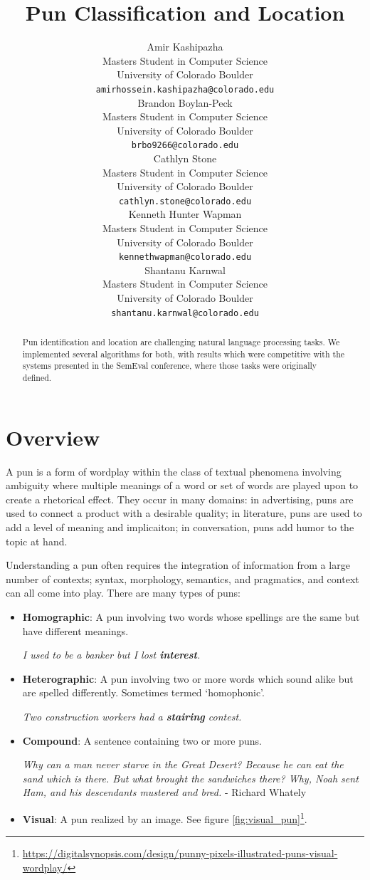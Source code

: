 \documentclass{article}
\title{Pun Classification and Location}
\author{
   Amir Kashipazha \\
   Masters Student in Computer Science\\
   University of Colorado Boulder\\
   \texttt{amirhossein.kashipazha@colorado.edu} \\
   \And
   Brandon Boylan-Peck \\
   Masters Student in Computer Science\\
   University of Colorado Boulder \\
   \texttt{brbo9266@colorado.edu} \\
   \And
   Cathlyn Stone \\
   Masters Student in Computer Science\\
   University of Colorado Boulder \\
   \texttt{cathlyn.stone@colorado.edu} \\
   \And
   Kenneth Hunter Wapman \\
   Masters Student in Computer Science\\
   University of Colorado Boulder \\
   \texttt{kennethwapman@colorado.edu} \\
   \And
   Shantanu Karnwal \\
   Masters Student in Computer Science\\
   University of Colorado Boulder \\
   \texttt{shantanu.karnwal@colorado.edu} \\
}
\begin{document}
\maketitle

\begin{abstract}
	Pun identification and location are challenging natural language processing 
	tasks. We implemented several algorithms for both, with results which 
	were competitive with the systems presented in the SemEval conference, where
	those tasks were originally defined.
\end{abstract}


\section{Overview}
A pun is a form of wordplay within the class of textual phenomena involving
ambiguity where multiple meanings of a word or set of words are played upon to
create a rhetorical effect. They occur in many domains: in advertising, puns
are used to connect a product with a desirable quality; in literature, puns are
used to add a level of meaning and implicaiton; in conversation, puns add humor
to the topic at hand.

Understanding a pun often requires the integration of information from a large
number of contexts; syntax, morphology, semantics, and pragmatics, and context
can all come into play. There are many types of puns:

\begin{itemize}
	\item{\textbf{Homographic}: A pun involving two words whose spellings are
		the same but have different meanings.
		\begin{center}
		\emph{I used to be a banker but I lost \textbf{interest}.}
		\end{center}
	}
	\item{\textbf{Heterographic}: A pun involving two or more words which sound
		alike but are spelled differently. Sometimes termed `homophonic'.
		\begin{center}
		\emph{Two construction workers had a \textbf{stairing} contest.}
		\end{center}
	}
	\item{\textbf{Compound}: A sentence containing two or more puns.
		\begin{center}
		\emph{Why can a man never starve in the Great Desert? Because he can
		eat the sand which is there. But what brought the sandwiches there?
		Why, Noah sent Ham, and his descendants mustered and bred.} - Richard Whately
		\end{center}
	}
	\item{\textbf{Visual}: A pun realized by an image. See figure \ref{fig:visual_pun}\footnote{\url{https://digitalsynopsis.com/design/punny-pixels-illustrated-puns-visual-wordplay/}}.
	}
\end{itemize}
\end{document}
